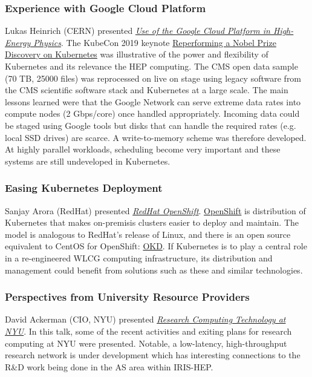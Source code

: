 \documentclass[11pt,letterpaper,fleqn]{article}
\begin{document}
\subsubsection{Experience with Google Cloud Platform}
\vspace{0.2cm}
Lukas Heinrich (CERN) presented \href{https://indico.cern.ch/event/820946/contributions/3461593/attachments/1867157/3070768/go}{\textit{Use of the Google Cloud Platform in High-Energy Physics}}. The KubeCon 2019 keynote \href{https://sched.co/MRyv}{Reperforming a Nobel Prize Discovery on Kubernetes} was illustrative of the power and flexibility of Kubernetes and its relevance the HEP computing. The CMS open data sample (70 TB, 25000 files) was reprocessed on live on stage using legacy software from the CMS scientific software stack and Kubernetes at a large scale. The main lessons learned were that the Google Network can serve extreme data rates into compute nodes (2 Gbps/core) once handled appropriately. Incoming data could be staged using Google tools but disks that can handle the required rates (e.g. local SSD drives) are scarce. A write-to-memory scheme was therefore developed. At highly parallel workloads, scheduling become very important and these systems are still undeveloped in Kubernetes.

\subsubsection{Easing Kubernetes Deployment}
\vspace{0.2cm}
Sanjay Arora (RedHat) presented \href{https://indico.cern.ch/event/820946/contributions/3461594/attachments/1867161/3070777/OpenShift_4.pdf}{\textit{RedHat OpenShift}}. \href{https://www.openshift.com/}{OpenShift} is distribution of Kubernetes that makes on-premisis clusters easier to deploy and maintain. The model is analogous to RedHat's release of Linux, and there is an open source equivalent to {\sf CentOS} for OpenShift: \href{https://www.okd.io/}{OKD}. If Kubernetes is to play a central role in a re-engineered WLCG computing infrastructure, its distribution and management could benefit from solutions such as these and similar technologies.

\subsubsection{Perspectives from University Resource Providers}
\vspace{0.2cm}
David Ackerman (CIO, NYU) presented \href{https://indico.cern.ch/event/820946/contributions/3461596/attachments/1867159/3070772/go}{\textit{Research Computing Technology at NYU}}. In this talk, some of the recent activities and exiting plans for research computing at NYU were presented. Notable, a low-latency, high-throughput research network is under development which has interesting connections to the R\&D work being done in the AS area within IRIS-HEP.
\end{document}
